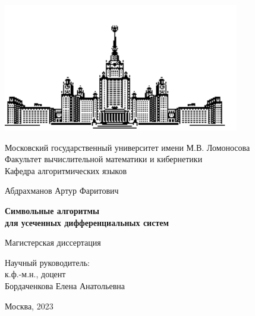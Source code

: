 \begin{titlepage}
    \begin{center}
        \includegraphics[scale=1]{титульник/msu-eps-converted-to.pdf}
        
        Московский государственный университет имени М.В. Ломоносова \\
        Факультет вычислительной математики и кибернетики \\
        Кафедра алгоритмических языков \\
        \vspace{1cm}

        \vspace{6em}

        Абдрахманов Артур Фаритович \\
    \end{center}

    \vspace{1.2em}

    \begin{center}
        \Large
        \textbf{Символьные алгоритмы \\
        для усеченных дифференциальных систем}
    \end{center}

    \vspace{5em}

    \begin{center}
        Магистерская диссертация
    \end{center}
    
    \vspace{6em}

    \begin{flushright}
        Научный руководитель: \\
        к.ф.-м.н., доцент \\
        Бордаченкова Елена Анатольевна \\
    \end{flushright}

    \vspace{\fill}

    \begin{center}
        Москва, 2023
    \end{center}

\end{titlepage}